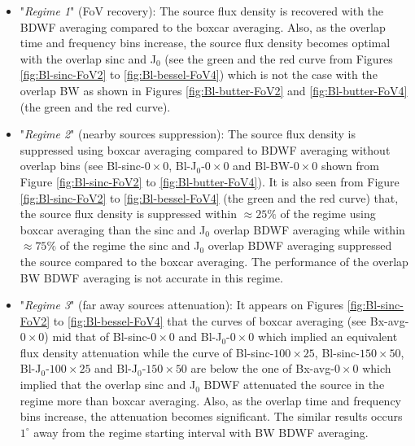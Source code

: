 \documentclass[useAMS,usenatbib]{mn2e}
\begin{document}
\begin{itemize}
 \item "\textit{Regime 1}" (FoV recovery): The source flux density is recovered with the BDWF averaging compared to the boxcar averaging. 
Also, as the overlap time and frequency bins increase, the source flux density becomes optimal with the overlap sinc and J$_0$ (see the 
green and the red curve from Figures \ref{fig:Bl-sinc-FoV2} to \ref{fig:Bl-bessel-FoV4}) which is not the case with the overlap BW as shown 
in Figures \ref{fig:Bl-butter-FoV2} and \ref{fig:Bl-butter-FoV4} (the green and the red curve).
\item "\textit{Regime 2}" (nearby sources suppression): The source flux density is suppressed using boxcar averaging compared to 
BDWF averaging without overlap bins (see Bl-sinc-$0\times0$, Bl-J$_0$-$0\times0$ and Bl-BW-$0\times0$ shown  from Figure 
\ref{fig:Bl-sinc-FoV2} to \ref{fig:Bl-butter-FoV4}). It is also seen from Figure \ref{fig:Bl-sinc-FoV2} to \ref{fig:Bl-bessel-FoV4} 
(the green and the red curve) that, the source flux density is suppressed within $\approx 25\%$ of the regime using boxcar 
averaging than the sinc and J$_0$ overlap BDWF averaging while within $\approx 75\%$ of the regime the sinc and J$_0$ overlap BDWF 
averaging suppressed the source compared to the boxcar averaging. The performance of the overlap BW BDWF averaging is not accurate in this 
regime.
\item "\textit{Regime 3}" (far away sources attenuation): It appears on Figures \ref{fig:Bl-sinc-FoV2} to \ref{fig:Bl-bessel-FoV4}  that  
the curves of boxcar averaging (see Bx-avg-$0\times0$) mid that of Bl-sinc-$0\times0$ and Bl-J$_0$-$0\times0$ which implied an equivalent 
flux density 
attenuation while the curve of 
Bl-sinc-$100\times25$, Bl-sinc-$150\times50$, Bl-J$_0$-$100\times25$ and Bl-J$_0$-$150\times50$ are below the one of Bx-avg-$0\times0$ which 
implied 
that the overlap sinc and J$_0$ BDWF attenuated the source in the regime more than boxcar averaging. Also, as the overlap time and frequency 
bins increase, the attenuation becomes significant. The similar results occurs $1^{\circ}$ away from the regime 
starting interval with BW BDWF averaging.
\end{itemize}
% 
% 
\end{document}
